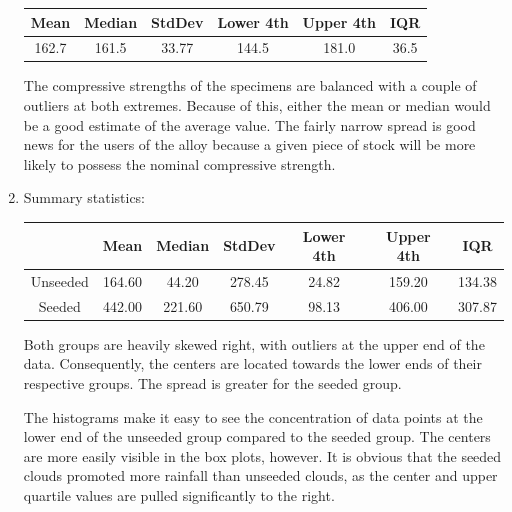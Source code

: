 \documentclass[12pt,letterpaper]{article}
\begin{document}
\begin{enumerate}
		\begin{table}[!h]
			\centering
			\begin{tabular}{|c|c|c|c|c|c|} \hline
				Mean & Median & StdDev & Lower 4th & Upper 4th & IQR \\ \hline
				162.7 & 161.5 & 33.77 & 144.5 & 181.0 & 36.5 \\ \hline
			\end{tabular}
		\end{table}

		The compressive strengths of the specimens are balanced with a couple
		of outliers at both extremes. Because of this, either the mean or
		median would be a good estimate of the average value. The fairly narrow
		spread is good news for the users of the alloy because a given piece of
		stock will be more likely to possess the nominal compressive strength.

	\item Summary statistics:

		\begin{table}[!h]
			\centering
			\begin{tabular}{|c|c|c|c|c|c|c|} \hline
				& Mean & Median & StdDev & Lower 4th & Upper 4th & IQR \\ \hline\hline
				Unseeded & 164.60 & 44.20 & 278.45 & 24.82 & 159.20 & 134.38 \\ \hline
				Seeded   & 442.00 & 221.60 & 650.79 & 98.13 & 406.00 & 307.87 \\ \hline
			\end{tabular}
		\end{table}

		Both groups are heavily skewed right, with outliers at the upper end of
		the data. Consequently, the centers are located towards the lower ends
		of their respective groups. The spread is greater for the seeded group.

		The histograms make it easy to see the concentration of data points at
		the lower end of the unseeded group compared to the seeded group. The
		centers are more easily visible in the box plots, however. It is
		obvious that the seeded clouds promoted more rainfall than unseeded
		clouds, as the center and upper quartile values are pulled
		significantly to the right.
\end{enumerate}
\end{document}
